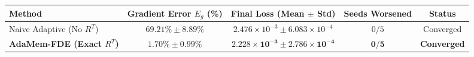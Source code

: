 \begin{tabular}{lcccc}
\toprule
\textbf{Method} & \textbf{Gradient Error $E_g$ (\%)} & \textbf{Final Loss (Mean $\pm$ Std)} & \textbf{Seeds Worsened} & \textbf{Status} \\
\midrule
Naive Adaptive (No $R^T$) & $69.21\% \pm 8.89\%$ & $2.476 \times 10^{-3} \pm 6.083 \times 10^{-4}$ & $0/5$ & Converged \\
\textbf{AdaMem-FDE (Exact $R^T$)} & $\mathbf{1.70\% \pm 0.99\%}$ & $\mathbf{2.228 \times 10^{-3} \pm 2.786 \times 10^{-4}}$ & $\mathbf{0/5}$ & \textbf{Converged} \\
\bottomrule
\end{tabular}